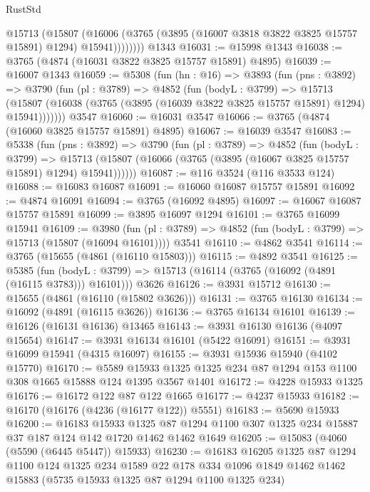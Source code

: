 \begin{lexlean}{RustStd}
\begin{coremodule}
            @15713
              (@15807
                (@16006 (@3765 (@3895 (@16007 @3818 @3822 @3825 @15757 @15891) @1294) @15941))))))))
    @1343
@16031 := @15998 @1343
@16038 := @3765 (@4874 (@16031 @3822 @3825 @15757 @15891) @4895)
@16039 := @16007 @1343
@16059 := @5308
    (fun (hn : @16) =>
    @3893
      (fun (pns : @3892) =>
      @3790
        (fun (pl : @3789) =>
        @4852
          (fun (bodyL : @3799) =>
          @15713
            (@15807 (@16038 (@3765 (@3895 (@16039 @3822 @3825 @15757 @15891) @1294) @15941)))))))
    @3547
@16060 := @16031 @3547
@16066 := @3765 (@4874 (@16060 @3825 @15757 @15891) @4895)
@16067 := @16039 @3547
@16083 := @5338
    (fun (pns : @3892) =>
    @3790
      (fun (pl : @3789) =>
      @4852
        (fun (bodyL : @3799) =>
        @15713 (@15807 (@16066 (@3765 (@3895 (@16067 @3825 @15757 @15891) @1294) @15941))))))
@16087 := @116 @3524 (@116 @3533 @124)
@16088 := @16083 @16087
@16091 := @16060 @16087 @15757 @15891
@16092 := @4874 @16091
@16094 := @3765 (@16092 @4895)
@16097 := @16067 @16087 @15757 @15891
@16099 := @3895 @16097 @1294
@16101 := @3765 @16099 @15941
@16109 := @3980
    (fun (pl : @3789) => @4852 (fun (bodyL : @3799) => @15713 (@15807 (@16094 @16101))))
    @3541
@16110 := @4862 @3541
@16114 := @3765 (@15655 (@4861 (@16110 @15803)))
@16115 := @4892 @3541
@16125 := @5385
    (fun (bodyL : @3799) => @15713 (@16114 (@3765 (@16092 (@4891 (@16115 @3783))) @16101)))
    @3626
@16126 := @3931 @15712
@16130 := @15655 (@4861 (@16110 (@15802 @3626)))
@16131 := @3765 @16130
@16134 := @16092 (@4891 (@16115 @3626))
@16136 := @3765 @16134 @16101
@16139 := @16126 (@16131 @16136) @13465
@16143 := @3931 @16130 @16136 (@4097 @15654)
@16147 := @3931 @16134 @16101 (@5422 @16091)
@16151 := @3931 @16099 @15941 (@4315 @16097)
@16155 := @3931 @15936 @15940 (@4102 @15770)
@16170 := @5589
    @15933
    @1325
    @1325
    @234
    @87
    @1294
    @153
    @1100
    @308
    @1665
    @15888
    @124
    @1395
    @3567
    @1401
@16172 := @4228 @15933 @1325
@16176 := @16172 @122 @87 @122 @1665
@16177 := @4237 @15933
@16182 := @16170 (@16176 (@4236 (@16177 @122)) @5551)
@16183 := @5690 @15933
@16200 := @16183
    @15933
    @1325
    @87
    @1294
    @1100
    @307
    @1325
    @234
    @15887
    @37
    @187
    @124
    @142
    @1720
    @1462
    @1462
    @1649
@16205 := @15083 (@4060 (@5590 (@6445 @5447)) @15933)
@16230 := @16183
    @16205
    @1325
    @87
    @1294
    @1100
    @124
    @1325
    @234
    @1589
    @22
    @178
    @334
    @1096
    @1849
    @1462
    @1462
    @15883
    (@5735 @15933 @1325 @87 @1294 @1100 @1325 @234)

\end{coremodule}
\end{lexlean}
